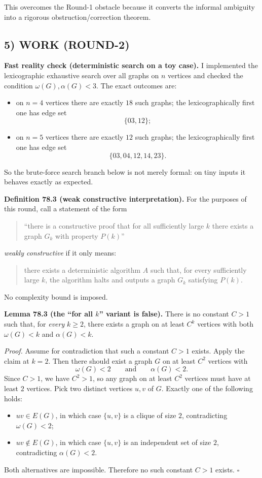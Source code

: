 This overcomes the Round-1 obstacle because it converts the informal ambiguity into a rigorous obstruction/correction theorem.

\subsection*{5) WORK (ROUND-2)}

\noindent\textbf{Fast reality check (deterministic search on a toy case).}
I implemented the lexicographic exhaustive search over all graphs on $n$ vertices and checked the condition $\omega(G),\alpha(G)<3$.
The exact outcomes are:
\begin{itemize}
\item on $n=4$ vertices there are exactly $18$ such graphs; the lexicographically first one has edge set
\[
\{03,12\};
\]
\item on $n=5$ vertices there are exactly $12$ such graphs; the lexicographically first one has edge set
\[
\{03,04,12,14,23\}.
\]
\end{itemize}
So the brute-force search branch below is not merely formal: on tiny inputs it behaves exactly as expected.

\medskip
\noindent\textbf{Definition 78.3 (weak constructive interpretation).}
For the purposes of this round, call a statement of the form
\begin{quote}
``there is a constructive proof that for all sufficiently large $k$ there exists a graph $G_k$ with property $P(k)$''
\end{quote}
\emph{weakly constructive} if it only means:
\begin{quote}
there exists a deterministic algorithm $A$ such that, for every sufficiently large $k$, the algorithm halts and outputs a graph $G_k$ satisfying $P(k)$.
\end{quote}
No complexity bound is imposed.

\medskip
\noindent\textbf{Lemma 78.3 (the ``for all $k$'' variant is false).}
There is no constant $C>1$ such that, for \emph{every} $k\ge 2$, there exists a graph on at least $C^k$ vertices with both $\omega(G)<k$ and $\alpha(G)<k$.

\emph{Proof.}
Assume for contradiction that such a constant $C>1$ exists.
Apply the claim at $k=2$.
Then there should exist a graph $G$ on at least $C^2$ vertices with
\[
\omega(G)<2\qquad\text{and}\qquad \alpha(G)<2.
\]
Since $C>1$, we have $C^2>1$, so any graph on at least $C^2$ vertices must have at least $2$ vertices.
Pick two distinct vertices $u,v$ of $G$.
Exactly one of the following holds:
\begin{itemize}
\item $uv\in E(G)$, in which case $\{u,v\}$ is a clique of size $2$, contradicting $\omega(G)<2$;
\item $uv\notin E(G)$, in which case $\{u,v\}$ is an independent set of size $2$, contradicting $\alpha(G)<2$.
\end{itemize}
Both alternatives are impossible.
Therefore no such constant $C>1$ exists. \hfill$\square$

